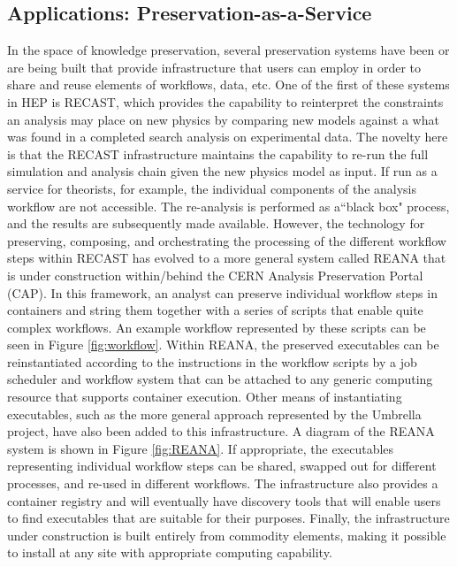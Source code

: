 \documentclass[11pt]{article}
\begin{document}
\subsection{Applications: Preservation-as-a-Service}\label{Applications_PaaS}
In the space of knowledge preservation, several preservation systems have been or are being built that provide infrastructure that users can employ in order to share and reuse elements of workflows, data, etc. One of the first of these systems in HEP is RECAST\cite{RECAST}, which provides the capability to reinterpret the constraints an analysis may place on new physics by comparing new models against a what was found in a completed search analysis on experimental data.  The novelty here is that the RECAST infrastructure maintains the capability to re-run the full simulation and analysis chain given the new physics model as input. If run as a service for theorists, for example, the individual components of the analysis workflow are not accessible.  The re-analysis is performed as a``black box" process, and the results are subsequently made available. However, the technology for preserving, composing, and orchestrating the processing of the different workflow steps within RECAST has evolved to a more general system called REANA  that is under construction within/behind the CERN Analysis Preservation Portal (CAP)\cite{CAP}.  In this framework, an analyst can preserve individual workflow steps in containers and string them together with a series of scripts that enable quite complex workflows.  An example workflow represented by these scripts can be seen in Figure \ref{fig:workflow}.  Within REANA, the preserved executables can be reinstantiated according to the instructions in the workflow scripts by a job scheduler and workflow system that can be attached to any generic computing resource that supports container execution. Other means of instantiating executables, such as the more general approach represented by the Umbrella project\cite{Umbrella}, have also been added to this infrastructure.  A diagram of the REANA system is shown in Figure \ref{fig:REANA}. If appropriate, the executables representing individual workflow steps can be shared, swapped out for different processes, and re-used in different workflows.  The infrastructure also provides a container registry and will eventually have discovery tools that will enable users to find executables that are suitable for their purposes.  Finally, the infrastructure under construction is built entirely from commodity elements, making it possible to install at any site with appropriate computing capability.
\end{document}
